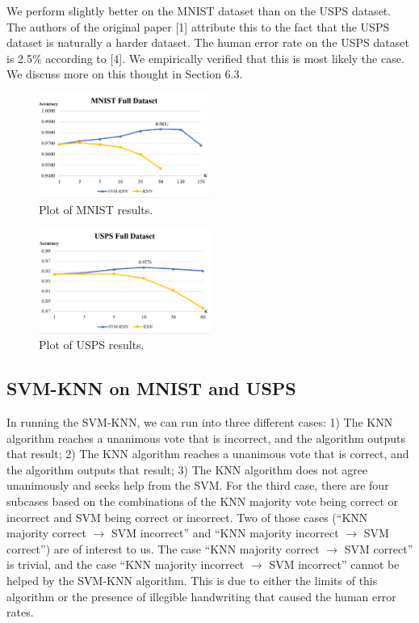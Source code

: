 \documentclass[11pt,letterpaper]{article}
\begin{document}
We perform slightly better on the MNIST dataset than on the USPS dataset. The authors of the original paper [1] attribute this to the fact that the USPS dataset is naturally a harder dataset. The human error rate on the USPS dataset is 2.5$\%$ according to [4]. We empirically verified that this is most likely the case. We discuss more on this thought in Section 6.3.

\begin{figure}[t!]
  \centering
  \includegraphics[keepaspectratio, width=0.5\textwidth]{mnist_full.png}
  \caption{Plot of MNIST results.}
\end{figure}

\begin{figure}[t!]
  \centering
  \includegraphics[keepaspectratio, width=0.5\textwidth]{usps_full.png}
  \caption{Plot of USPS results.}
\end{figure}

\subsection{SVM-KNN on MNIST and USPS}

In running the SVM-KNN, we can run into three different cases: 1) The KNN algorithm reaches a unanimous vote that is incorrect, and the algorithm outputs that result; 2) The KNN algorithm reaches a unanimous vote that is correct, and the algorithm outputs that result; 3) The KNN algorithm does not agree unanimously and seeks help from the SVM. For the third case, there are four subcases based on the combinations of the KNN majority vote being correct or incorrect and SVM being correct or incorrect. Two of those cases (``KNN majority correct $\rightarrow$ SVM incorrect'' and ``KNN majority incorrect $\rightarrow$ SVM correct'') are of interest to us. The case ``KNN majority correct $\rightarrow$ SVM correct'' is trivial, and the case ``KNN majority incorrect $\rightarrow$ SVM incorrect'' cannot be helped by the SVM-KNN algorithm. This is due to either the limits of this algorithm or the presence of illegible handwriting that caused the human error rates.
\end{document}
